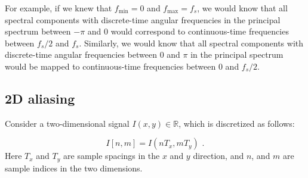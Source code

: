 For example, if we knew that $f_{\mathrm{min}} = 0$ and $f_{\mathrm{max}} = f_s$, we would know that all spectral components with discrete-time angular frequencies in the principal spectrum between $-\pi$ and $0$ would correspond to continuous-time frequencies between $f_s/2$ and $f_s$. Similarly, we would know that all spectral components with discrete-time angular frequencies between 0 and $\pi$ in the principal spectrum would be mapped to continuous-time frequencies between 0 and $f_s/2$.
\fi

\subsection{2D aliasing}
Consider a two-dimensional signal $I(x,y) \in \mathbb{R}$, which is discretized as follows:

\begin{equation}
I[n,m]=I(n T_x, m T_y)\,\,.
\end{equation}
Here $T_x$ and $T_y$ are sample spacings in the $x$ and $y$ direction, and $n$, and $m$ are sample indices in the two dimensions.

